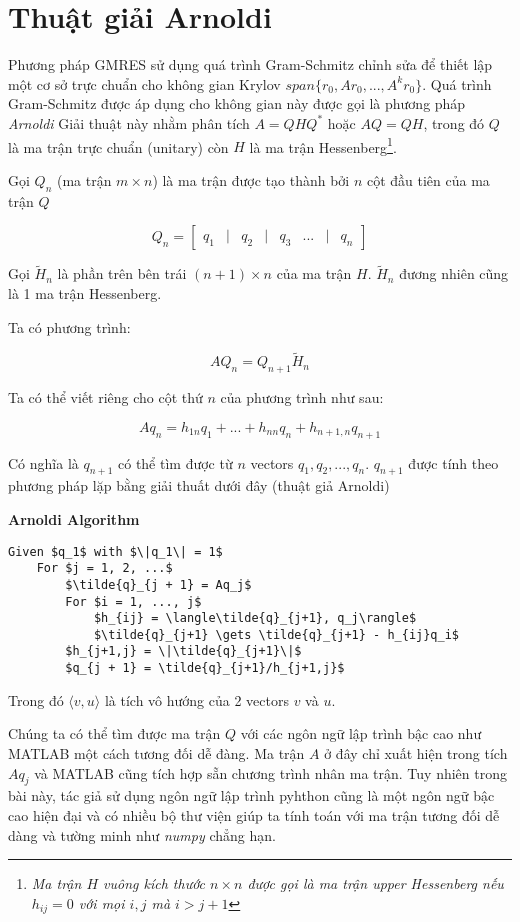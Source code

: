 \section{Thuật giải Arnoldi}
Phương pháp GMRES sử dụng quá trình Gram-Schmitz chỉnh sửa để thiết lập
một cơ sở trực chuẩn cho không gian Krylov $span\{r_0, Ar_0, ..., A^kr_0 \}$.
Quá trình Gram-Schmitz được áp dụng cho không gian này được gọi là phương pháp \textit{Arnoldi}
Giải thuật này nhằm phân tích $A=QHQ^*$ hoặc $AQ = QH$, trong đó $Q$ là ma trận trực chuẩn (unitary) 
còn $H$ là ma trận Hessenberg\footnote{
    \textit{
    Ma trận $H$ vuông kích thước $n \times n$ được gọi là ma trận upper Hessenberg nếu
    $h_{ij} = 0$ với mọi $i,j$ mà $i > j + 1$
}
}.

Gọi $Q_n$ (ma trận $m \times n$) là ma trận được tạo thành bởi $n$ cột đầu tiên của ma trận $Q$

\begin{equation}
    Q_n = \begin{bmatrix}
        q_1 & | & q_2 & | & q_3 & ... & | & q_n
    \end{bmatrix}    
\end{equation}

Gọi $\tilde{H}_n$ là phần trên bên trái $(n + 1) \times n$ của ma trận $H$.
$\tilde{H}_n$ đương nhiên cũng là 1 ma trận Hessenberg. 

Ta có phương trình:

\begin{equation}
    AQ_n = Q_{n + 1}\tilde{H}_n
\end{equation}

Ta có thể viết riêng cho cột thứ $n$ của phương trình như sau:

\begin{equation}
    Aq_n = h_{1n}q_1 + ... + h_{nn}q_n + h_{n+1,n}q_{n + 1}
\end{equation}

Có nghĩa là $q_{n+1}$ có thể tìm được từ $n$ vectors $q_1, q_2, ..., q_n$. 
$q_{n+1}$ được tính theo phương pháp lặp bằng giải thuất dưới đây (thuật giả Arnoldi)


\textbf{Arnoldi Algorithm}
\begin{lstlisting}[style=algo]
    Given $q_1$ with $\|q_1\| = 1$
    For $j = 1, 2, ...$
        $\tilde{q}_{j + 1} = Aq_j$
        For $i = 1, ..., j$
            $h_{ij} = \langle\tilde{q}_{j+1}, q_j\rangle$
            $\tilde{q}_{j+1} \gets \tilde{q}_{j+1} - h_{ij}q_i$
        $h_{j+1,j} = \|\tilde{q}_{j+1}\|$
        $q_{j + 1} = \tilde{q}_{j+1}/h_{j+1,j}$
\end{lstlisting}

Trong đó $\langle v, u \rangle$ là tích vô hướng của 2 vectors $v$ và $u$.

Chúng ta có thể tìm được ma trận $Q$ với các ngôn ngữ lập trình bậc cao như MATLAB một cách 
tương đối dễ đàng. Ma trận $A$ ở đây chỉ xuất hiện trong tích $Aq_j$ và MATLAB cũng tích hợp 
sẵn chương trình nhân ma trận. Tuy nhiên trong bài này, tác giả sử dụng ngôn ngữ lập trình pyhthon 
cũng là một ngôn ngữ bậc cao hiện đại và có nhiều bộ thư viện giúp ta tính toán với ma trận tương 
đối dễ dàng và tường minh như \textit{numpy} chẳng hạn.
